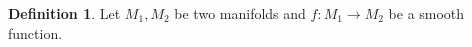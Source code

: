 \documentclass[a4paper, 11pt]{article}
\theoremstyle{definition}
\newtheorem{definition}{Definition}[section]
\begin{document}
\begin{definition}
Let $M_1, M_2$ be two manifolds and $f: M_1 \rightarrow M_2$ be a smooth function.
\end{definition}

%
\end{document}
